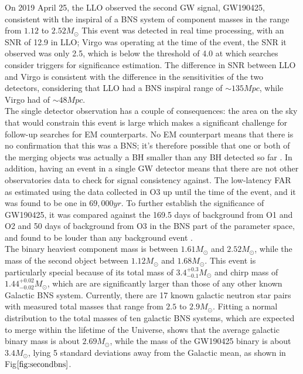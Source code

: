\documentclass[binding=0.6cm, LaM]{sapthesis}
\begin{document}
	On 2019 April 25, the LLO observed the second GW signal, GW190425, 
	consistent with the inspiral of a BNS system of component masses in the range from $1.12$ to $2.52 M_\odot$ 
	This event was detected in real time processing, with an SNR of 12.9 in LLO; 
	Virgo was operating at the time of the event, the SNR it observed was only 2.5, 
	which is below the threshold of 4.0 at which searches consider triggers for significance estimation. 
	The difference in SNR between LLO and Virgo is consistent with the difference 
	in the sensitivities of the two detectors, considering that LLO had 
	a BNS inspiral range of $\sim135 Mpc$, while Virgo had of $\sim48 Mpc$. \\
	The single detector observation has a couple of consequences: 
	the area on the sky that would constrain this event is large which 	
	makes a significant challenge for follow-up searches for EM counterparts. 
	No EM counterpart means that there is no confirmation that this was a BNS; 
	it’s therefore possible that one or both of the merging objects was actually 
	a BH smaller than any BH detected so far \cite{148}.
	In addition, having an event in a single GW detector means that there are not other 
	observatories data to check for signal consistency against. 
	The low-latency FAR as estimated using the data collected in O3 
	up until the time of the event, and it was found to be one in $69,000 yr$. 
	To further establish the significance of GW190425, it was compared against the 169.5 
	days of background from O1 and O2 and 50 days of background 
	from O3 in the BNS part of the parameter space, and found to be 
	louder than any background event \cite{148}. \\
	The binary heaviest component mass is between $1.61M_\odot$ and $2.52 M_\odot$, 
	while the mass of the second object between $1.12M_\odot$ and $1.68 M_\odot$.
	This event is particularly special because of its total mass of $3.4^{+0.3}_{-0.1} M_\odot$ 
	and chirp mass of $1.44^{+0.02}_{-0.02}M_\odot$, which are are significantly larger 
	than those of any other known Galactic BNS system. 
	Currently, there are 17 known galactic neutron star pairs with measured total masses 
	that range from $2.5$ to $2.9 M_\odot$. 
	Fitting a normal distribution to the total masses of ten galactic BNS systems, 
	which are expected to merge within the lifetime of the Universe, 
	shows that the average galactic binary mass is about $2.69 M_\odot$, 
	while the mass of the GW190425 binary is about $3.4 M_\odot$, 
	lying 5 standard deviations away from the Galactic mean, as shown in Fig$\ref{fig:secondbns}$. \\ 
\end{document}
